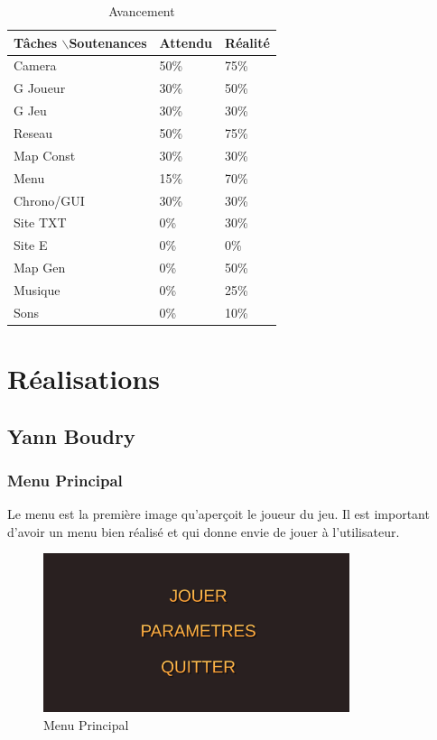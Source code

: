 \documentclass{article}
\begin{document}
\begin{table}
\centering
\caption{Avancement}
\begin{tabular}{|l|l|l|}
\hline

Tâches $\backslash$Soutenances & Attendu & Réalité \\ \hline
Camera & 50\% & 75\% \\ \hline
G Joueur & 30\% & 50\% \\ \hline
G Jeu & 30\% & 30\% \\ \hline
Reseau & 50\% & 75\% \\ \hline
Map Const & 30\% & 30\% \\ \hline
Menu & 15\% & 70\% \\ \hline
Chrono/GUI & 30\% & 30\% \\ \hline
Site TXT & 0\% & 30\% \\ \hline
Site E & 0\% & 0\% \\ \hline
Map Gen & 0\% & 50\% \\ \hline
Musique & 0\% & 25\% \\ \hline
Sons & 0\% & 10\% \\ \hline

\end{tabular}
\end{table}
 
\newpage
\section{Réalisations}


\subsection{Yann Boudry}

\subsubsection{Menu Principal}

Le menu est la première image qu'aperçoit le joueur du jeu. Il est important d'avoir un menu bien réalisé et qui donne envie de jouer à l'utilisateur.

\par\vspace{0.5cm}
\begin{figure}[!h]
    \centering
    \includegraphics[width=0.8\textwidth]{MainMenu.png}
    \caption{Menu Principal}
    \label{Main Menu}
\end{figure}{}
\end{document}
